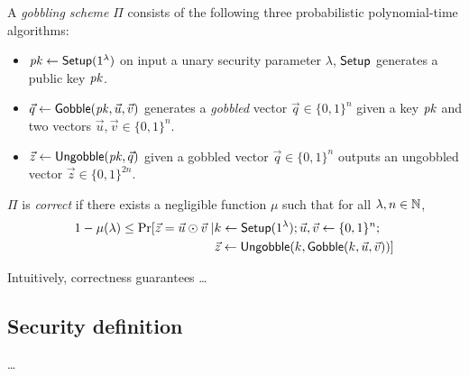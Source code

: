 \begin{definition}
	A \emph{gobbling scheme} $\Pi$ consists of the following three probabilistic polynomial-time algorithms:
	\begin{itemize}
		\item $\mathit{pk} \leftarrow \mathsf{Setup}(1^\lambda)$  
			on input a unary security parameter $\lambda$, $\mathsf{Setup}$ generates a public key $\mathit{pk}$.
		\item $\vec{q} \leftarrow \mathsf{Gobble}(\mathit{pk}, \vec{u}, \vec{v})$ generates a \emph{gobbled} vector $\vec{q}\in\{0,1\}^n$ given a key $\mathit{pk}$ and two vectors $\vec{u},\vec{v}\in\{0,1\}^n$.
		\item $\vec{z} \leftarrow \mathsf{Ungobble}(\mathit{pk}, \vec{q})$ given a gobbled vector $\vec{q}\in\{0,1\}^n$ outputs an ungobbled vector $\vec{z}\in\{0,1\}^{2n}$.
	\end{itemize}
	$\Pi$ is \emph{correct} if there exists a negligible function $\mu$ such that for all $\lambda,n\in\mathbb{N}$,
	\begin{align*}
		1-\mu(\lambda) \leq \Pr[\vec{z} = \vec{u}\odot\vec{v} \mid & k\leftarrow \mathsf{Setup}(1^\lambda); \vec{u},\vec{v}\leftarrow \{0,1\}^n; \\
		& \vec{z} \leftarrow \mathsf{Ungobble}(k, \mathsf{Gobble}(k, \vec{u},\vec{v}))]
	\end{align*}
\end{definition}
\noindent Intuitively, correctness guarantees \dots

\subsection{Security definition}
\dots
